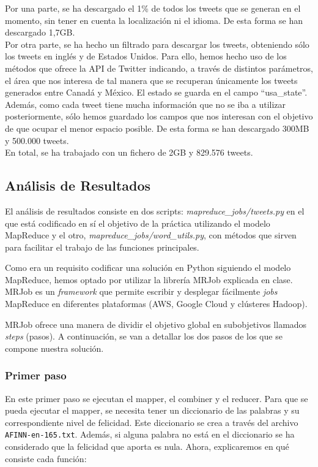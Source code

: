 \documentclass[12pt,a4paper]{article}
\begin{document}
Por una parte, se ha descargado el 1\% de todos los tweets que se generan en el momento, sin tener en cuenta la localización ni el idioma. De esta forma se han descargado 1,7GB.\\
Por otra parte, se ha hecho un filtrado para descargar los tweets, obteniendo sólo los tweets en inglés y de Estados Unidos. Para ello, hemos hecho uso de los métodos que ofrece la API de Twitter indicando, a través de distintos parámetros, el área que nos interesa de tal manera que se recuperan únicamente los tweets generados entre Canadá y México. 
El estado se guarda en el campo ``usa\_state''. Además, como cada tweet tiene mucha información que no se iba a utilizar posteriormente, sólo hemos guardado los campos que nos interesan con el objetivo de que ocupar el menor espacio posible. De esta forma se han descargado 300MB y 500.000 tweets.\\
En total, se ha trabajado con un fichero de 2GB y 829.576 tweets.


\subsection{Análisis de Resultados}

El análisis de resultados consiste en dos scripts: \textit{mapreduce\_jobs/tweets.py} en el que está codificado en sí el objetivo de la práctica utilizando el modelo MapReduce y el otro, \textit{mapreduce\_jobs/word\_utils.py}, con métodos que sirven para facilitar el trabajo de las funciones principales. 

Como era un requisito codificar una solución en Python siguiendo el modelo MapReduce, hemos optado por utilizar la librería MRJob explicada en clase. MRJob es un \textit{framework} que permite escribir y desplegar fácilmente \textit{jobs} MapReduce en diferentes plataformas (AWS, Google Cloud y clústeres Hadoop).

MRJob ofrece una manera de dividir el objetivo global en subobjetivos llamados \textit{steps} (pasos). A continuación, se van a detallar los dos pasos de los que se compone nuestra solución.

\subsubsection{Primer paso}
En este primer paso se ejecutan el mapper, el combiner y el reducer. Para que se pueda ejecutar el mapper, se necesita tener un diccionario de las palabras y su correspondiente nivel de felicidad. Este diccionario se crea a través del archivo \texttt{AFINN-en-165.txt}. Además, si alguna palabra no está en el diccionario se ha considerado que la felicidad que aporta es nula. Ahora, explicaremos en qué consiste cada función:
\end{document}
